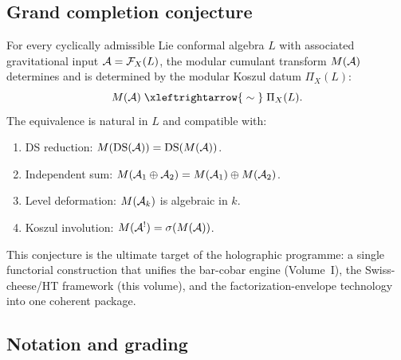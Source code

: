 \subsection{Grand completion conjecture}

\begin{conjecture}
For every cyclically admissible Lie conformal algebra $L$ with
associated gravitational input $\mathcal{A} = \mathcal{F}_X(L)$, the
modular cumulant transform $M(\mathcal{A})$ determines and is determined by
the modular Koszul datum $\Pi_X(L)$:
\begin{equation}%
M(\cA) \;\xleftrightarrow{\;\sim\;}\; \Pi_X(L).
\end{equation}
The equivalence is natural in $L$ and compatible with:
\begin{enumerate}[label=\textup{(\roman*)}]
\item DS reduction: $M(\mathrm{DS}(\mathcal{A})) = \mathrm{DS}(M(\mathcal{A}))$.
\item Independent sum: $M(\mathcal{A}_1 \oplus \mathcal{A}_2) = M(\mathcal{A}_1) \oplus
 M(\mathcal{A}_2)$.
\item Level deformation: $M(\mathcal{A}_k)$ is algebraic in $k$.
\item Koszul involution: $M(\mathcal{A}^!) = \sigma(M(\mathcal{A}))$.
\end{enumerate}
\end{conjecture}

\begin{remark}
This conjecture is the ultimate target of the holographic programme:
a single functorial construction that unifies the bar-cobar engine
(Volume~I), the Swiss-cheese/HT framework (this volume), and the
factorization-envelope technology into one coherent package.
\end{remark}


\subsection{Notation and grading}

